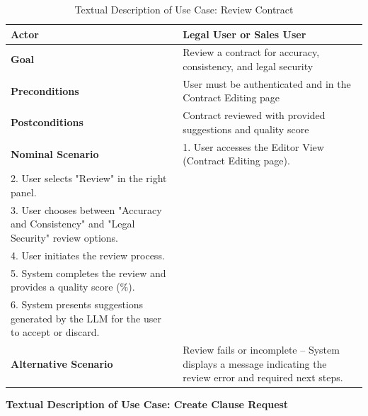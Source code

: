 \begin{table}[ht!]
    \centering
    \small
    \begin{tabularx}{\textwidth}{|l|X|}
        \hline
        \textbf{Actor} & Legal User or Sales User \\
        \hline
        \textbf{Goal} & Review a contract for accuracy, consistency, and legal security \\
        \hline
        \textbf{Preconditions} & User must be authenticated and in the Contract Editing page \\
        \hline
        \textbf{Postconditions} & Contract reviewed with provided suggestions and quality score \\
        \hline
        \textbf{Nominal Scenario} &
            1. User accesses the Editor View (Contract Editing page). \\[3pt]
            2. User selects "Review" in the right panel. \\[3pt]
            3. User chooses between "Accuracy and Consistency" and "Legal Security" review options. \\[3pt]
            4. User initiates the review process. \\[3pt]
            5. System completes the review and provides a quality score (\%). \\[3pt]
            6. System presents suggestions generated by the LLM for the user to accept or discard. \\
        \hline
        \textbf{Alternative Scenario} & Review fails or incomplete – System displays a message indicating the review error and required next steps. \\
        \hline
    \end{tabularx}
    \caption{Textual Description of Use Case: Review Contract}
    \label{tab:review_contract}
\end{table}

\textbf{Textual Description of Use Case: Create Clause Request}

